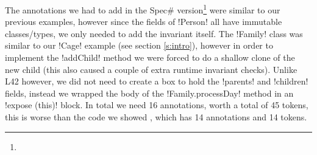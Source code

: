 The annotations we had to add in the Spec\# version\footnote{ } were similar to our previous examples, however since the fields of \Q!Person! all have immutable classes/types, we only needed to add the invariant itself. The \Q!Family! class was similar to our \Q!Cage! example (see section \ref{s:intro}), however in order to implement the \Q!addChild! method we were forced to do a shallow clone of the new child (this also caused a couple of extra runtime invariant checks). Unlike L42 however, we did not need to create a box to hold the \Q!parents! and \Q!children! fields, instead we wrapped the body of the \Q!Family.processDay! method in an \Q!expose (this)! block. In total we need 16 annotations, worth a total of 45 tokens, this is worse than the code  we showed  , which has 14 annotations and 14 tokens.


